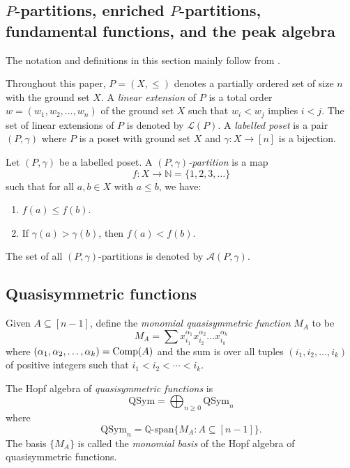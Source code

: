\documentclass[11pt]{amsart}
\numberwithin{equation}{section}
\newcommand{\QSym}{\mathrm{QSym}}
\newcommand{\bbQ}{{\mathbb{Q}}}
\begin{document}
\subsection{$P$-partitions, enriched $P$-partitions, fundamental functions, and the peak algebra}\label{subsec:(enr)Ppar}

The notation and definitions in this section mainly follow from \cite{S97}.


Throughout this paper, $P=(X,\leq)$ denotes a partially ordered set of size $n$ with the ground set $X$. A \emph{linear extension} of $P$ is a total order $w=(w_1,w_2,\dots,w_n)$ of the ground set $X$ such that $w_i< w_j$ implies $i< j$. The set of linear extensions of $P$ is denoted by $\mathcal{L}(P)$. A \emph{labelled poset} is a pair $(P,\gamma)$ where $P$ is a poset with ground set $X$ and $\gamma:X\to[n]$ is a bijection.

Let $(P,\gamma)$ be a labelled poset. A \emph{$(P,\gamma)$-partition} is a map 
$$f:X\to\mathbb{N}=\{1,2,3,\dots\}$$ such that for all $a,b\in X$ with $a\leq b$, we have:
\begin{enumerate}
	\item $f(a)\leq f(b)$.
	\item If $\gamma(a)>\gamma(b)$, then $f(a)<f(b)$.
\end{enumerate}

The set of all $(P,\gamma)$-partitions is denoted by $\mathcal{A}(P,\gamma)$.

\subsection{Quasisymmetric functions}

Given $A\subseteq [n-1]$, define the \emph{monomial quasisymmetric function} $M_A$ to be 
\[
M_A=\sum x_{i_1}^{\alpha_1}x_{i_2}^{\alpha_2} \dots x_{i_k}^{\alpha_k}
\]
where $(\alpha_1,\alpha_2,\dots,\alpha_k)={\rm Comp}(A)$ and the sum is over all tuples $(i_1,i_2,\dots,i_k)$ of positive integers such that $i_1<i_2<\cdots <i_k$.


The Hopf algebra of \emph{quasisymmetric functions} is  
$$\QSym=\displaystyle\bigoplus_{n\geq 0}\QSym_n$$
where
$$\QSym_n=\mathbb{Q}\text{-span}\{M_A:A\subseteq [n-1]\}.$$
The basis $\{M_A\}$ is called the \emph{monomial basis} of the Hopf algebra of quasisymmetric functions.
%
\end{document}
